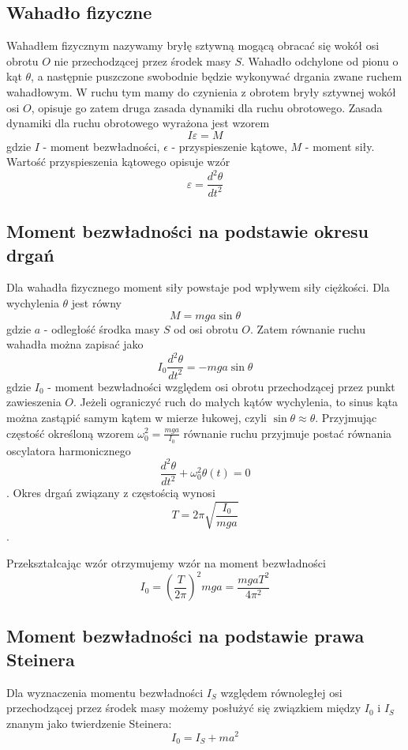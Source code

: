 \documentclass[a4paper,10pt,twoside]{article}
\begin{document}
\subsection{Wahadło fizyczne}

Wahadłem fizycznym nazywamy bryłę sztywną mogącą obracać się wokół osi obrotu $O$ nie przechodzącej przez środek masy $S$. Wahadło odchylone od pionu o kąt $\theta$, a następnie puszczone swobodnie będzie wykonywać drgania zwane ruchem wahadłowym. W ruchu tym mamy do czynienia z obrotem bryły sztywnej wokół osi $O$, opisuje go zatem druga zasada dynamiki dla ruchu obrotowego.
Zasada dynamiki dla ruchu obrotowego wyrażona jest wzorem $$I\varepsilon = M$$ gdzie $I$ - moment bezwładności, $\epsilon$ - przyspieszenie kątowe, $M$ - moment siły. Wartość przyspieszenia kątowego opisuje wzór $$\varepsilon = \frac{d^2\theta}{dt^2}$$

\subsection{Moment bezwładności na podstawie okresu drgań}
Dla wahadła fizycznego moment siły powstaje pod wpływem siły ciężkości. Dla wychylenia $\theta$ jest równy $$M = m g a \sin\theta$$ gdzie $a$ - odległość środka masy $S$ od osi obrotu $O$. Zatem równanie ruchu wahadła można zapisać jako $$ I_0 \frac{d^2\theta}{dt^2} = -m g a \sin \theta$$ gdzie $I_0$ - moment bezwładności względem osi obrotu przechodzącej przez punkt zawieszenia $O$. Jeżeli ograniczyć ruch do małych kątów wychylenia, to sinus kąta można zastąpić samym kątem w mierze łukowej, czyli $\sin\theta \approx \theta$. Przyjmując częstość określoną wzorem $\omega_0^2 = \frac{mga}{I_0}$  równanie ruchu przyjmuje postać równania oscylatora harmonicznego $$ \frac{d^2\theta}{dt^2}+\omega_0^2\theta(t) = 0$$. Okres drgań związany z częstością wynosi $$ T = 2 \pi \sqrt{\frac{I_0}{mga}} $$.

Przekształcając wzór otrzymujemy wzór na moment bezwładności $$ I_0 = \left( \frac{T}{2\pi} \right)^2mga = \frac{mgaT^2}{4\pi^2}$$

\subsection{Moment bezwładności na podstawie prawa Steinera}

Dla wyznaczenia momentu bezwładności $I_S$ względem równoległej osi przechodzącej przez środek masy możemy posłużyć się związkiem między $I_0$ i $I_S$ znanym jako twierdzenie Steinera: 
$$ I_0 = I_S + ma^2$$
\end{document}
